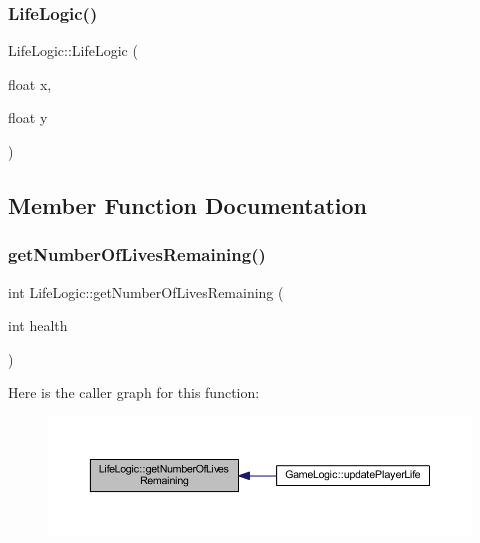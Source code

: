 \mbox{\label{class_life_logic_a535c38f9912f4298ebd1b86425a5cd59}} 
\subsubsection{\texorpdfstring{Life\+Logic()}{LifeLogic()}\hspace{0.1cm}{\footnotesize\ttfamily [2/2]}}
{\footnotesize\ttfamily Life\+Logic\+::\+Life\+Logic (\begin{DoxyParamCaption}\item[{float}]{x,  }\item[{float}]{y }\end{DoxyParamCaption})}



\subsection{Member Function Documentation}
\mbox{\label{class_life_logic_aedae9924b6ebe33182c3b8b8150b8060}} 
\subsubsection{\texorpdfstring{get\+Number\+Of\+Lives\+Remaining()}{getNumberOfLivesRemaining()}}
{\footnotesize\ttfamily int Life\+Logic\+::get\+Number\+Of\+Lives\+Remaining (\begin{DoxyParamCaption}\item[{int}]{health }\end{DoxyParamCaption})}

Here is the caller graph for this function\+:\nopagebreak
\begin{figure}[H]
\begin{center}
\leavevmode
\includegraphics[width=350pt]{class_life_logic_aedae9924b6ebe33182c3b8b8150b8060_icgraph}
\end{center}
\end{figure}
\mbox{\label{class_life_logic_a84143479d62e550adebd0c319ae3520a}} 
